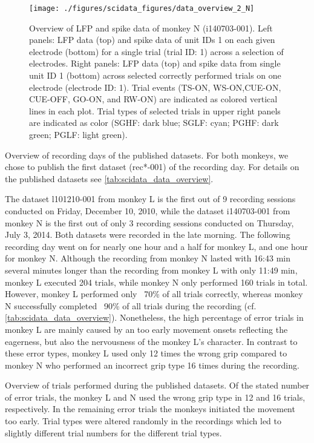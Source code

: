 {\begin{figure}
 \texttt{[image: ./figures/scidata\_figures/data\_overview\_2\_N]}
 \caption[Overview of LFP and spike data of monkey N (i140703-001)]{Overview of LFP and spike data of monkey N (i140703-001). Left panels: LFP data (top) and spike data of unit IDs 1 on each given electrode (bottom) for a single trial (trial ID: 1) across a selection of electrodes. Right panels: LFP data (top) and spike data from single unit ID 1 (bottom) across selected correctly performed trials on one electrode (electrode ID: 1). Trial events (TS-ON, WS-ON,CUE-ON, CUE-OFF, GO-ON, and RW-ON) are indicated as colored vertical lines in each plot. Trial types of selected trials in upper right panels are indicated as color (SGHF: dark blue; SGLF: cyan; PGHF: dark green; PGLF: light green).}
 \label{fig:overview_data_n_2}
\end{figure}


Overview of recording days of the published datasets. For both monkeys, we chose to publish the first dataset (rec*-001) of the recording day. For details on the published datasets see \cref{tab:scidata_data_overview}.

The dataset l101210-001 from monkey L is the first out of 9 recording sessions conducted on Friday, December 10, 2010, while the dataset i140703-001 from monkey N is the first out of only 3 recording sessions conducted on Thursday, July 3, 2014. Both datasets were recorded in the late morning. The following recording day went on for nearly one hour and a half for monkey L, and one hour for monkey N. Although the recording from monkey N lasted with 16:43 min several minutes longer than the recording from monkey L with only 11:49 min, monkey L executed 204 trials, while monkey N only performed 160 trials in total. However, monkey L performed only ~70\% of all trials correctly, whereas monkey N successfully completed ~90\% of all trials during the recording (cf. \cref{tab:scidata_data_overview}). Nonetheless, the high percentage of error trials in monkey L are mainly caused by an too early movement onsets reflecting the eagerness, but also the nervousness of the monkey L's character. In contrast to these error types, monkey L used only 12 times the wrong grip compared to monkey N who performed an incorrect grip type 16 times during the recording. 

Overview of trials performed during the published datasets. Of the stated number of error trials, the monkey L and N used the wrong grip type in 12 and 16 trials, respectively. In the remaining error trials the monkeys initiated the movement too early. Trial types were altered randomly in the recordings which led to slightly different trial numbers for the different trial types.

}
